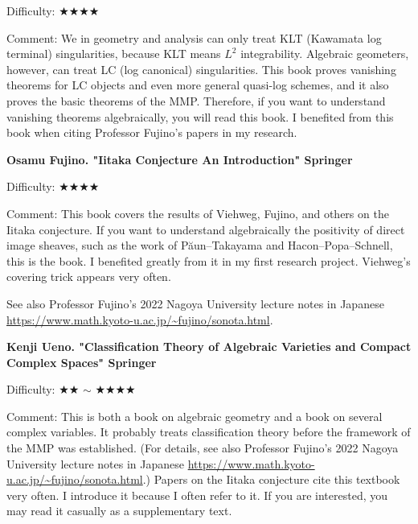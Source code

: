 Difficulty: ★★★★\vspace{-6pt} 

Comment: We in geometry and analysis can only treat KLT (Kawamata log terminal) singularities, because KLT means $L^2$ integrability. Algebraic geometers, however, can treat LC (log canonical) singularities. This book proves vanishing theorems for LC objects and even more general quasi-log schemes, and it also proves the basic theorems of the MMP. Therefore, if you want to understand vanishing theorems algebraically, you will read this book. I benefited from this book when citing Professor Fujino's papers in my research.

\vspace{8pt}

\textbf{Osamu Fujino. "Iitaka Conjecture An Introduction" Springer} \vspace{-6pt}

Difficulty: ★★★★\vspace{-6pt} 

Comment: This book covers the results of Viehweg, Fujino, and others on the Iitaka conjecture. If you want to understand algebraically the positivity of direct image sheaves, such as the work of P\u{a}un--Takayama and Hacon--Popa--Schnell, this is the book. I benefited greatly from it in my first research project. Viehweg's covering trick appears very often.

See also Professor Fujino's 2022 Nagoya University lecture notes in Japanese \url{https://www.math.kyoto-u.ac.jp/~fujino/sonota.html}.
\vspace{8pt}

\textbf{Kenji Ueno. "Classification Theory of Algebraic Varieties and Compact Complex Spaces" Springer}  　\vspace{-6pt} 

Difficulty: ★★ $\sim$ ★★★★  　\vspace{-6pt} 

Comment: This is both a book on algebraic geometry and a book on several complex variables. It probably treats classification theory before the framework of the MMP was established. (For details, see also Professor Fujino's 2022 Nagoya University lecture notes in Japanese \url{https://www.math.kyoto-u.ac.jp/~fujino/sonota.html}.) Papers on the Iitaka conjecture cite this textbook very often. I introduce it because I often refer to it. If you are interested, you may read it casually as a supplementary text.
\vspace{8pt}

